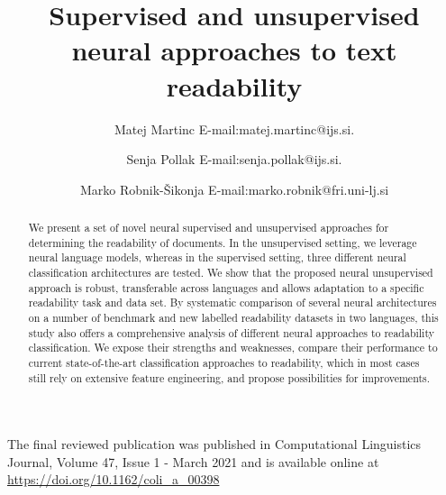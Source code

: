 \documentclass{clv3}
\begin{document}
\title{Supervised and unsupervised neural approaches to text readability}





\author{Matej Martinc E-mail:matej.martinc@ijs.si.}

\author{Senja Pollak E-mail:senja.pollak@ijs.si.}

\author{Marko Robnik-\v{S}ikonja E-mail:marko.robnik@fri.uni-lj.si}




\maketitle


\begin{snugshade*}
\noindent The  final reviewed  publication  was published in Computational Linguistics Journal, Volume 47,  Issue 1 - March 2021 and is available online at \url{https://doi.org/10.1162/coli_a_00398}
\end{snugshade*}



\begin{abstract}
We present a set of novel neural supervised and unsupervised approaches for determining the readability of documents. In the unsupervised setting, we leverage neural language models, whereas in the supervised setting, three different neural classification architectures are tested. We show that the proposed neural unsupervised approach is robust, transferable across languages and allows adaptation to a specific readability task and data set. By systematic comparison of several neural architectures on a number of benchmark and new labelled readability datasets in two languages, this study also offers a comprehensive analysis of different neural approaches to readability classification. We expose their strengths and weaknesses, compare their performance to current state-of-the-art classification approaches to readability, which in most cases still rely on extensive feature engineering, and propose possibilities for improvements.
\end{abstract}
\end{document}

